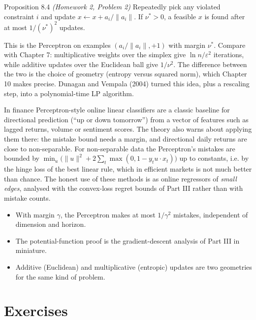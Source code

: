 \documentclass[11pt,a4paper,openany]{book}
\newcommand{\eps}{\varepsilon}
\newcommand{\norm}[1]{\lVert #1\rVert}
\begin{document}
\begin{bthm}{Proposition 8.4 \emph{(Homework 2, Problem 2)}}
Repeatedly pick any violated constraint $i$ and update $x\leftarrow x+a_i/\norm{a_i}$. If $\nu^*>0$, a feasible $x$ is found after at most $1/(\nu^*)^2$ updates.
\end{bthm}

This is the Perceptron on examples $(a_i/\norm{a_i},+1)$ with margin $\nu^*$. Compare with Chapter 7: multiplicative weights over the simplex give $\ln n/\eps^2$ iterations, while additive updates over the Euclidean ball give $1/\nu^2$. The difference between the two is the choice of geometry (entropy versus squared norm), which Chapter 10 makes precise. Dunagan and Vempala (2004) turned this idea, plus a rescaling step, into a polynomial-time LP algorithm.

\begin{bfin}{In finance}
Perceptron-style online linear classifiers are a classic baseline for directional prediction (``up or down tomorrow'') from a vector of features such as lagged returns, volume or sentiment scores. The theory also warns about applying them there: the mistake bound needs a margin, and directional daily returns are close to non-separable. For non-separable data the Perceptron's mistakes are bounded by $\min_u\big(\norm u^2+2\sum_t\max(0,1-y_tu\cdot x_t)\big)$ up to constants, i.e. by the hinge loss of the best linear rule, which in efficient markets is not much better than chance. The honest use of these methods is as online regressors of \emph{small edges}, analysed with the convex-loss regret bounds of Part III rather than with mistake counts.
\end{bfin}

\begin{takeaways}
\begin{itemize}
\item With margin $\gamma$, the Perceptron makes at most $1/\gamma^2$ mistakes, independent of dimension and horizon.
\item The potential-function proof is the gradient-descent analysis of Part III in miniature.
\item Additive (Euclidean) and multiplicative (entropic) updates are two geometries for the same kind of problem.
\end{itemize}
\end{takeaways}

\section*{Exercises}\label{ch8-ex}
\end{document}
